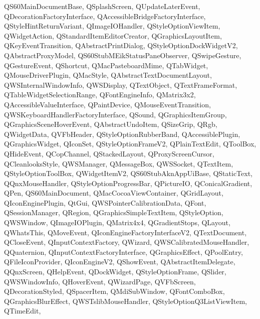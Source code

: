 {{    QS60MainDocumentBase,%
    QSplashScreen,%
    QUpdateLaterEvent,%
    QDecorationFactoryInterface,%
    QAccessibleBridgeFactoryInterface,%
    QStyleHintReturnVariant,%
    QImageIOHandler,%
    QStyleOptionViewItem,%
    QWidgetAction,%
    QStandardItemEditorCreator,%
    QGraphicsLayoutItem,%
    QKeyEventTransition,%
    QAbstractPrintDialog,%
    QStyleOptionDockWidgetV2,%
    QAbstractProxyModel,%
    QS60StubMEikStatusPaneObserver,%
    QSwipeGesture,%
    QGestureEvent,%
    QShortcut,%
    QMacPasteboardMime,%
    QTabWidget,%
    QMouseDriverPlugin,%
    QMacStyle,%
    QAbstractTextDocumentLayout,%
    QWSInternalWindowInfo,%
    QWSDisplay,%
    QTextObject,%
    QTextFrameFormat,%
    QTableWidgetSelectionRange,%
    QFontEngineInfo,%
    QMatrix3x2,%
    QAccessibleValueInterface,%
    QPaintDevice,%
    QMouseEventTransition,%
    QWSKeyboardHandlerFactoryInterface,%
    QSound,%
    QGraphicsItemGroup,%
    QGraphicsSceneHoverEvent,%
    QAbstractUndoItem,%
    QSizeGrip,%
    QRgb,%
    QWidgetData,%
    QVFbHeader,%
    QStyleOptionRubberBand,%
    QAccessiblePlugin,%
    QGraphicsWidget,%
    QIconSet,%
    QStyleOptionFrameV2,%
    QPlainTextEdit,%
    QToolBox,%
    QHideEvent,%
    QCopChannel,%
    QStackedLayout,%
    QProxyScreenCursor,%
    QCleanlooksStyle,%
    QWSManager,%
    QMessageBox,%
    QWSSocket,%
    QTextItem,%
    QStyleOptionToolBox,%
    QWidgetItemV2,%
    QS60StubAknAppUiBase,%
    QStaticText,%
    QQnxMouseHandler,%
    QStyleOptionProgressBar,%
    QPictureIO,%
    QConicalGradient,%
    QPen,%
    QS60MainDocument,%
    QMacCocoaViewContainer,%
    QGridLayout,%
    QIconEnginePlugin,%
    QtGui,%
    QWSPointerCalibrationData,%
    QFont,%
    QSessionManager,%
    QRegion,%
    QGraphicsSimpleTextItem,%
    QStyleOption,%
    QWSWindow,%
    QImageIOPlugin,%
    QMatrix4x4,%
    QGradientStops,%
    QLayout,%
    QWhatsThis,%
    QMoveEvent,%
    QIconEngineFactoryInterfaceV2,%
    QTextDocument,%
    QCloseEvent,%
    QInputContextFactory,%
    QWizard,%
    QWSCalibratedMouseHandler,%
    QQuaternion,%
    QInputContextFactoryInterface,%
    QGraphicsEffect,%
    QPoolEntry,%
    QFileIconProvider,%
    QIconEngineV2,%
    QShowEvent,%
    QAbstractItemDelegate,%
    QQnxScreen,%
    QHelpEvent,%
    QDockWidget,%
    QStyleOptionFrame,%
    QSlider,%
    QWSWindowInfo,%
    QHoverEvent,%
    QWizardPage,%
    QVFbScreen,%
    QDecorationStyled,%
    QSpacerItem,%
    QMdiSubWindow,%
    QFontComboBox,%
    QGraphicsBlurEffect,%
    QWSTslibMouseHandler,%
    QStyleOptionQ3ListViewItem,%
    QTimeEdit,%
}}
